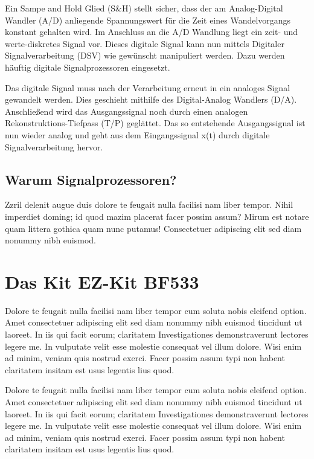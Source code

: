 \documentclass[a4paper,12pt,fontsize=12,DIV=12]{scrartcl}
\begin{document}


Ein Sampe and Hold Glied (S\&H) stellt sicher, dass der am Analog-Digital Wandler (A/D) anliegende Spannungswert für die Zeit eines Wandelvorgangs konstant gehalten wird.
Im Anschluss an die A/D Wandlung liegt ein zeit- und werte-diskretes Signal vor. Dieses digitale Signal kann nun mittels Digitaler Signalverarbeitung (DSV) wie gewünscht manipuliert werden. Dazu werden häuftig digitale Signalprozessoren eingesetzt.

Das digitale Signal muss nach der Verarbeitung erneut in ein analoges Signal gewandelt werden. Dies geschieht mithilfe des Digital-Analog Wandlers (D/A). Anschließend wird das Ausgangssignal noch durch einen analogen Rekonstruktions-Tiefpass (T/P) geglättet. Das so entstehende Ausgangssignal ist nun wieder analog und geht aus dem Eingangssignal x(t) durch digitale Signalverarbeitung hervor.

\subsection{Warum Signalprozessoren?}
Zzril delenit augue duis dolore te feugait nulla facilisi nam liber tempor. Nihil imperdiet doming; id quod mazim placerat facer possim assum? Mirum est notare quam littera gothica 
quam nunc putamus! Consectetuer adipiscing elit sed diam nonummy nibh euismod.

\section{Das Kit EZ-Kit BF533}
Dolore te feugait nulla facilisi nam liber tempor cum soluta nobis eleifend option. Amet consectetuer adipiscing elit sed diam nonummy nibh euismod tincidunt ut laoreet. In iis qui facit eorum; claritatem Investigationes demonstraverunt lectores legere me. In vulputate velit esse molestie consequat vel illum dolore. Wisi enim ad minim, veniam quis nostrud exerci. Facer possim assum typi non habent claritatem insitam est usus legentis lius quod.

Dolore te feugait nulla facilisi nam liber tempor cum soluta nobis eleifend option. Amet consectetuer adipiscing elit sed diam nonummy nibh euismod tincidunt ut laoreet. In iis qui facit eorum; claritatem Investigationes demonstraverunt lectores legere me. In vulputate velit esse molestie consequat vel illum dolore. Wisi enim ad minim, veniam quis nostrud exerci. Facer possim assum typi non habent claritatem insitam est usus legentis lius quod.
\end{document}
